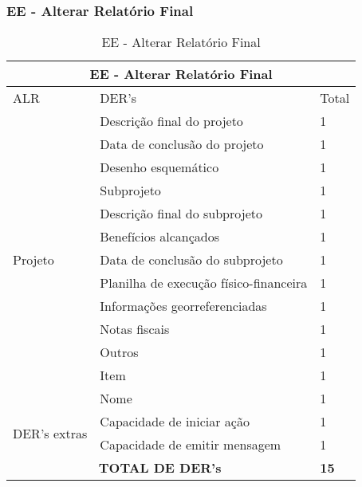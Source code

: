   \subsubsection{EE - Alterar Relatório Final}
  \begin{table}[!h]
\centering
\caption{EE - Alterar Relatório Final}
\label{ee_alterar_relatorio_final}
\begin{tabular}{|l|l|l|}
\hline
\multicolumn{3}{|c|}{EE - Alterar Relatório Final}                                                                 \\ \hline
ALR                           & DER's                                                & Total              \\ \hline
\multirow{13}{*}{Projeto}     & Descrição final do projeto             & 1 \\ \cline{2-3}
                             & Data de conclusão do projeto           & 1 \\ \cline{2-3}
                             & Desenho esquemático                    & 1 \\ \cline{2-3} 
			      & Subprojeto                             & 1 \\ \cline{2-3}
                             & Descrição final do subprojeto          & 1 \\ \cline{2-3}
                             & Benefícios alcançados                  & 1 \\ \cline{2-3}
                             & Data de conclusão do subprojeto        & 1 \\ \cline{2-3}
                             & Planilha de execução físico-financeira & 1 \\ \cline{2-3}
                             & Informações georreferenciadas          & 1 \\ \cline{2-3}
                             & Notas fiscais                          & 1 \\ \cline{2-3}
                             & Outros                                 & 1 \\ \cline{2-3}
                             & Item                                   & 1 \\ \cline{2-3}
                             & Nome                                   & 1 \\ \cline{2-3} \hline
\multirow{2}{*}{DER's extras} & Capacidade de iniciar ação             & 1 \\ \cline{2-3}
                 & Capacidade de emitir mensagem& 1 \\ \hline
\multicolumn{2}{|c|}{\textbf{TOTAL DE DER's}}                                                 & \textbf{15}                 \\ \hline
\end{tabular}
\end{table}


